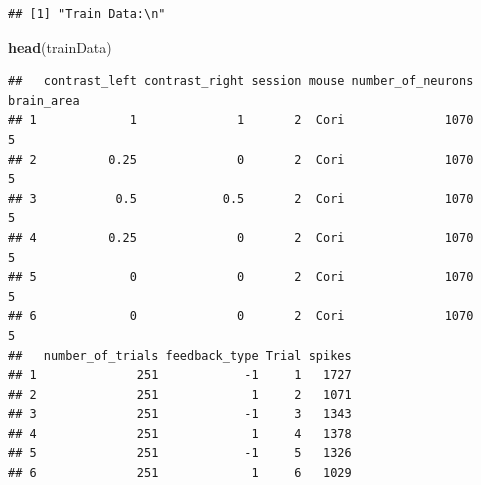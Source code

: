 \documentclass[
]{article}
\newenvironment{Shaded}{\begin{snugshade}}{\end{snugshade}}
\newcommand{\CommentTok}[1]{\textcolor[rgb]{0.56,0.35,0.01}{\textit{#1}}}
\newcommand{\DecValTok}[1]{\textcolor[rgb]{0.00,0.00,0.81}{#1}}
\newcommand{\DocumentationTok}[1]{\textcolor[rgb]{0.56,0.35,0.01}{\textbf{\textit{#1}}}}
\newcommand{\FunctionTok}[1]{\textcolor[rgb]{0.13,0.29,0.53}{\textbf{#1}}}
\newcommand{\NormalTok}[1]{#1}
\newcommand{\OtherTok}[1]{\textcolor[rgb]{0.56,0.35,0.01}{#1}}
\newcommand{\SpecialCharTok}[1]{\textcolor[rgb]{0.81,0.36,0.00}{\textbf{#1}}}
\newcommand{\StringTok}[1]{\textcolor[rgb]{0.31,0.60,0.02}{#1}}
\begin{document}
\begin{Shaded}
\end{Shaded}

\begin{verbatim}
## [1] "Train Data:\n"
\end{verbatim}

\begin{Shaded}
\begin{Highlighting}[]
\FunctionTok{head}\NormalTok{(trainData)}
\end{Highlighting}
\end{Shaded}

\begin{verbatim}
##   contrast_left contrast_right session mouse number_of_neurons brain_area
## 1             1              1       2  Cori              1070          5
## 2          0.25              0       2  Cori              1070          5
## 3           0.5            0.5       2  Cori              1070          5
## 4          0.25              0       2  Cori              1070          5
## 5             0              0       2  Cori              1070          5
## 6             0              0       2  Cori              1070          5
##   number_of_trials feedback_type Trial spikes
## 1              251            -1     1   1727
## 2              251             1     2   1071
## 3              251            -1     3   1343
## 4              251             1     4   1378
## 5              251            -1     5   1326
## 6              251             1     6   1029
\end{verbatim}
\end{document}
